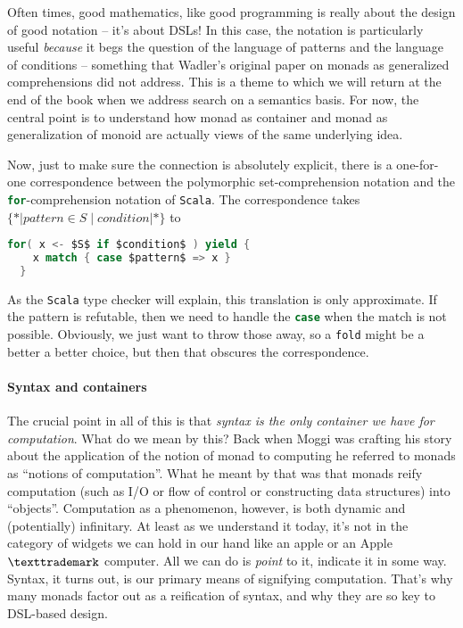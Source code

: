 Often times, good mathematics, like good programming is really about
the design of good notation -- it's about DSLs! In this case, the
notation is particularly useful \emph{because} it begs the question of the
language of patterns and the language of conditions -- something that
Wadler's original paper on monads as generalized comprehensions did
not address. This is a theme to which we will return at the end of the
book when we address search on a semantics basis. For now, the central
point is to understand how monad as container and monad as
generalization of monoid are actually views of the same underlying
idea.

Now, just to make sure the connection is absolutely explicit, there is
a one-for-one correspondence between the polymorphic set-comprehension
notation and the \lstinline[language=Scala]!for!-comprehension
notation of \texttt{Scala}. The correspondence takes
$\{*| pattern \in S \; | \; condition |*\}$ to

\begin{lstlisting}[language=Scala,mathescape=true]
  for( x <- $S$ if $condition$ ) yield {
    x match { case $pattern$ => x }
  }
\end{lstlisting}

As the \texttt{Scala} type checker will explain, this translation is
only approximate. If the pattern is refutable, then we need to handle
the \lstinline[language=Scala]!case! when the match is not
possible. Obviously, we just want to throw those away, so a
\lstinline[language=Scala]!fold! might be a better a better choice,
but then that obscures the correspondence.

\paragraph{Syntax and containers}
The crucial point in all of this is that \emph{syntax is the only
  container we have for computation}. What do we mean by this? Back
when Moggi was crafting his story about the application of the notion
of monad to computing he referred to monads as ``notions of
computation''. What he meant by that was that monads reify computation
(such as I/O or flow of control or constructing data structures) into
``objects''. Computation as a phenomenon, however, is both dynamic and
(potentially) infinitary. At least as we understand it today, it's not
in the category of widgets we can hold in our hand like an apple or an
Apple $\texttrademark$ computer. All we can do is \emph{point} to it,
indicate it in some way. Syntax, it turns out, is our primary means of
signifying computation. That's why many monads factor out as a
reification of syntax, and why they are so key to DSL-based design.

